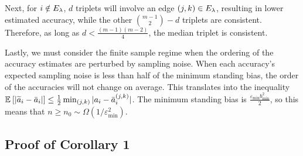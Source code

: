 Next, for $i \notin E_{\lambda}$, $d$ triplets will involve an edge $(j, k) \in E_{\lambda}$, resulting in lower estimated accuracy, while the other ${m - 1 \choose 2} - d$ triplets are consistent. Therefore, as long as $d < \frac{(m - 1)(m - 2)}{4}$, the median triplet is consistent. 

Lastly, we must consider the finite sample regime when the ordering of the accuracy estimates are perturbed by sampling noise. When each accuracy's expected sampling noise is less than half of the minimum standing bias, the order of the accuracies will not change on average. This translates into the inequality $\mathbb{E}_{}\left[|\widetilde{a}_i - \bar{a}_i|\right] \le \frac{1}{2} \min_{(j, k)}|a_i - \bar{a}_i^{(j, k)}|$. The minimum standing bias is $\frac{\varepsilon_{\min} b_{\min}^2}{2}$, so this means that $n \ge n_0 \sim \Omega(1/\varepsilon_{\min}^2)$.

\subsection{Proof of Corollary 1}



